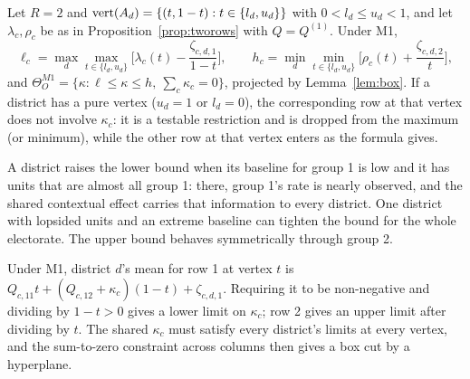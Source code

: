 \begin{proposition}\label{prop:D3}
Let $R=2$ and $\operatorname{vert}(A_d)=\{(t,1-t):t\in\{l_d,u_d\}\}$ with $0<l_d\le u_d<1$, and
let $\lambda_c,\rho_c$ be as in Proposition~\ref{prop:tworows} with $Q=Q^{(1)}$.
Under M1,
\[
\ell_c=\max_d\max_{t\in\{l_d,u_d\}}\Big[\lambda_c(t)-\frac{\zeta_{c,d,1}}{1-t}\Big],\qquad
h_c=\min_d\min_{t\in\{l_d,u_d\}}\Big[\rho_c(t)+\frac{\zeta_{c,d,2}}{t}\Big],
\]
and $\Theta^{M1}_O=\{\kappa:\ell\le\kappa\le h,\ \sum_c\kappa_c=0\}$, projected by
Lemma~\ref{lem:box}. If a district has a pure vertex ($u_d=1$ or $l_d=0$), the
corresponding row at that vertex does not involve $\kappa_c$: it is a testable
restriction and is dropped from the maximum (or minimum), while the other row at
that vertex enters as the formula gives.
\end{proposition}
\begin{reading}
A district raises the lower bound when its baseline for group 1 is low and it has
units that are almost all group 1: there, group 1's rate is nearly observed, and
the shared contextual effect carries that information to every district. One
district with lopsided units and an extreme baseline can tighten the bound for
the whole electorate. The upper bound behaves symmetrically through group 2.
\end{reading}
\begin{sketch}
Under M1, district $d$'s mean for row 1 at vertex $t$ is
$Q_{c,11}t+(Q_{c,12}+\kappa_c)(1-t)+\zeta_{c,d,1}$. Requiring it to be non-negative
and dividing by $1-t>0$ gives a lower limit on $\kappa_c$; row 2 gives an upper
limit after dividing by $t$. The shared $\kappa_c$ must satisfy every district's
limits at every vertex, and the sum-to-zero constraint across columns then gives
a box cut by a hyperplane.
\end{sketch}

